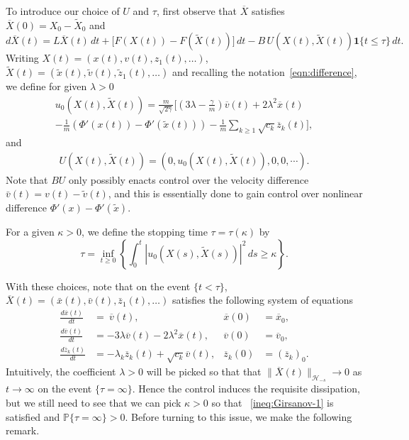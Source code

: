 \documentclass[11pt]{amsart}
\theoremstyle{definition}
\renewcommand{\H}{\mathcal{H}}
\newcommand{\Xtil}{\widetilde{X}}
\newcommand{\Xbar}{\overline{X}}
\newcommand{\xbar}{\overline{x}}
\newcommand{\vbar}{\overline{v}}
\newcommand{\zbar}{\overline{z}}
\theoremstyle{definition}
\theoremstyle{plain}
\numberwithin{equation}{section}
\begin{document}
To introduce our choice of $U$ and $\tau$, first observe that $\Xbar$ satisfies $\Xbar(0)= X_0-\Xtil_0$ and 
\begin{equation} \label{eqn:infinite-mode-coupling-c}
d\Xbar(t)=L\Xbar(t)\, dt+\big[F(X(t))-F(\Xtil(t))\big]\, dt-B \, U(X(t),\Xtil(t)) \textbf{1}\{t\leq\tau\} \, dt.
\end{equation}
Writing $X(t)= (x(t), v(t), z_1(t), \ldots)$, $\Xtil(t)=(\tilde{x}(t), \tilde{v}(t), \tilde{z}_1(t), \ldots)$ and recalling the notation~\eqref{eqn:difference}, we define for given $\lambda >0$
\begin{multline} \label{eqn:coupling}
u_0(X(t), \Xtil(t))=\frac{m}{\sqrt{2\gamma}}\Big[\left(3\lambda-\frac{\gamma}{m}\right)\overline{v}(t)+2\lambda^2\xbar(t)\\
-\frac{1}{m}\left(\Phi'(x(t))-\Phi'(\widetilde{x}(t))\right)-\frac{1}{m}\sum_{k\geq 1}\sqrt{c_k}\zbar_k(t)\Big] ,
\end{multline}
and 
\begin{align}
U(X(t), \Xtil(t))= (0, u_0(X(t), \Xtil(t)), 0, 0, \cdots). 
\end{align}
Note that $B U$ only possibly enacts control over the velocity difference $\bar{v}(t) = v(t) - \tilde{v}(t)$, and this is essentially done to gain control over nonlinear difference $\Phi'(x)- \Phi'(\tilde{x})$.  

For a given $\kappa >0$, we define the stopping time $\tau=\tau(\kappa)$ by   
\begin{equation}\label{eqn:stop-time}
\tau=\inf_{t\geq 0}\left\{\int_0^t |u_0(X(s), \Xtil(s))|^2 \, ds\geq \kappa\right\}.
\end{equation}


With these choices, note that on the event $\{ t< \tau\}$, $\Xbar(t)=(\bar{x}(t), \bar{v}(t), \bar{z}_1(t), \ldots)$ satisfies the following system of equations
\begin{align}\label{eqn:infinite-coupling}
\frac{d \xbar(t)}{dt} &=\ \vbar(t), & \xbar(0)&=\xbar_0,\\
\nonumber \frac{d \vbar(t)}{dt}&=-3\lambda\vbar(t)-2\lambda^2\xbar(t), &\vbar(0)&=\vbar_0,\\
\nonumber \frac{d \zbar_k(t)}{dt}&=-\lambda_k \zbar_k(t)+\sqrt{c_k}\vbar(t),&\zbar_k(0)&=(\zbar_k)_0 .\end{align}
Intuitively, the coefficient $\lambda>0$ will be picked so that that $\|\Xbar(t)\|_{\H_{-s} }\rightarrow 0$ as $t\rightarrow \infty$ on the event $\{ \tau = \infty\}$.   Hence the control induces the requisite dissipation, but we still need to see that we can pick $\kappa >0$ so that ~\eqref{ineq:Girsanov-1} is satisfied and $\mathbb{P} \{ \tau=\infty\} >0$.  Before turning to this issue, we make the following remark.
\end{document}
